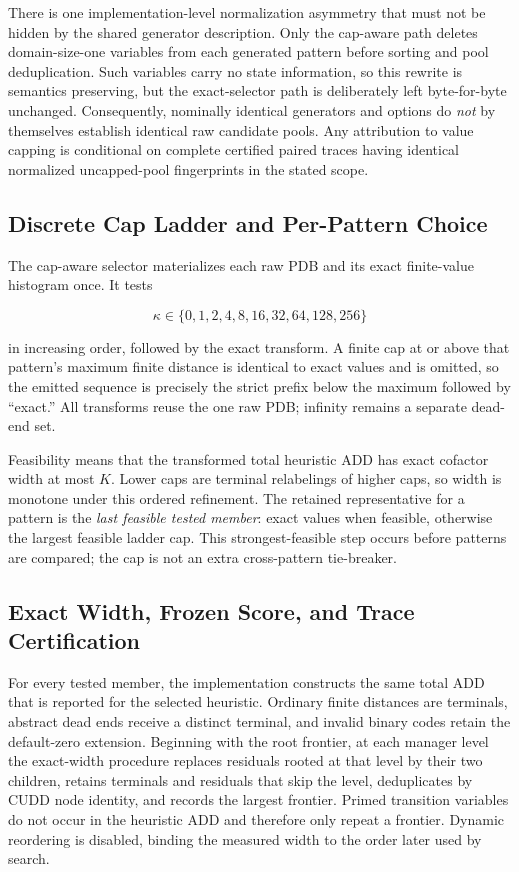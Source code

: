 There is one implementation-level normalization asymmetry that must not be
hidden by the shared generator description.  Only the cap-aware path deletes
domain-size-one variables from each generated pattern before sorting and pool
deduplication.  Such variables carry no state information, so this rewrite is
semantics preserving, but the exact-selector path is deliberately left
byte-for-byte unchanged.  Consequently, nominally identical generators and
options do \emph{not} by themselves establish identical raw candidate pools.
Any attribution to value capping is conditional on complete certified paired
traces having identical normalized uncapped-pool fingerprints in the stated
scope.

\subsection{Discrete Cap Ladder and Per-Pattern Choice}

The cap-aware selector materializes each raw PDB and its exact finite-value
histogram once.  It tests

\[
  \kappa\in\{0,1,2,4,8,16,32,64,128,256\}
\]

in increasing order, followed by the exact transform.  A finite cap at or
above that pattern's maximum finite distance is identical to exact values and
is omitted, so the emitted sequence is precisely the strict prefix below the
maximum followed by ``exact.''  All transforms reuse the one raw PDB;
infinity remains a separate dead-end set.

Feasibility means that the transformed total heuristic ADD has exact cofactor
width at most \(K\).  Lower caps are terminal relabelings of higher caps, so
width is monotone under this ordered refinement.  The retained representative
for a pattern is the \emph{last feasible tested member}: exact values when
feasible, otherwise the largest feasible ladder cap.  This strongest-feasible
step occurs before patterns are compared; the cap is not an extra cross-pattern
tie-breaker.

\subsection{Exact Width, Frozen Score, and Trace Certification}

For every tested member, the implementation constructs the same total ADD that
is reported for the selected heuristic.  Ordinary finite distances are
terminals, abstract dead ends receive a distinct terminal, and invalid binary
codes retain the default-zero extension.  Beginning with the root frontier, at
each manager level the exact-width procedure replaces residuals rooted at that
level by their two children, retains terminals and residuals that skip the
level, deduplicates by CUDD node identity, and records the largest frontier.
Primed transition variables do not occur in the heuristic ADD and therefore
only repeat a frontier.  Dynamic reordering is disabled, binding the measured
width to the order later used by search.

